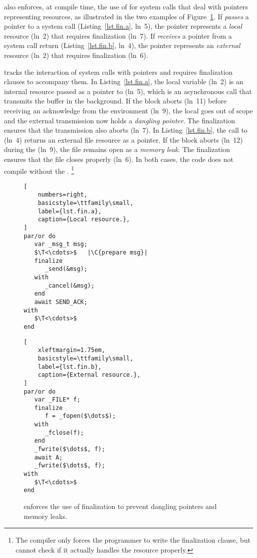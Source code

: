 \CEU also enforces, at compile time, the use of  for system
calls that deal with pointers representing resources, as illustrated in the two
examples of Figure~\ref{lst.fin}.
%
 If \CEU \emph{passes} a pointer to a system call (Listing~\ref{lst.fin.a},
    ln~5), the pointer represents a \emph{local} resource (ln~2) that
    requires finalization (ln~7).
 If \CEU \emph{receives} a pointer from a system call return
    (Listing~\ref{lst.fin.b}, ln~4), the pointer represents an
    \emph{external} resource (ln~2) that requires finalization (ln~6).

\CEU tracks the interaction of system calls with pointers and requires
finalization clauses to accompany them.
%
In Listing~\ref{lst.fin.a}, the local variable 
(ln~2) is an internal resource passed as a pointer to  (ln~5),
which is an asynchronous call that transmits the buffer in the background.
If the block aborts (ln~11) before receiving an acknowledge from the
environment (ln~9), the local  goes out of scope and the external
transmission now holds a \emph{dangling pointer}.
The finalization ensures that the transmission also aborts (ln~7).
%
In Listing~\ref{lst.fin.b}, the call to  (ln~4) returns an
external file resource as a pointer.
If the block aborts (ln~12) during the  (ln~9), the file
remains open as a \emph{memory leak}.
The finalization ensures that the file closes properly (ln~6).
%
In both cases, the code does not compile without the .%
\footnote{%
The compiler only forces the programmer to write the finalization clause, but
cannot check if it actually handles the resource properly.}

\begin{figure}[h!]
\begin{minipage}[t]{0.46\linewidth}
\begin{lstlisting}[
    numbers=right,
    basicstyle=\ttfamily\small,
    label={lst.fin.a},
    caption={Local resource.},
]
par/or do
   var _msg_t msg;
   $\T<\cdots>$   |\C{prepare msg}|
   finalize
      _send(&msg);
   with
      _cancel(&msg);
   end
   await SEND_ACK;
with
   $\T<\cdots>$
end

\end{lstlisting}
\end{minipage}%
%
\begin{minipage}[t]{0.54\linewidth}
\begin{lstlisting}[
    xleftmargin=1.75em,
    basicstyle=\ttfamily\small,
    label={lst.fin.b},
    caption={External resource.},
]
par/or do
   var _FILE* f;
   finalize
      f = _fopen($\dots$);
   with
      _fclose(f);
   end
   _fwrite($\dots$, f);
   await A;
   _fwrite($\dots$, f);
with
   $\T<\cdots>$
end
\end{lstlisting}
\end{minipage}%
\caption{%
\CEU enforces the use of finalization to prevent dangling pointers and memory leaks.}
\label{lst.fin}
\end{figure}

